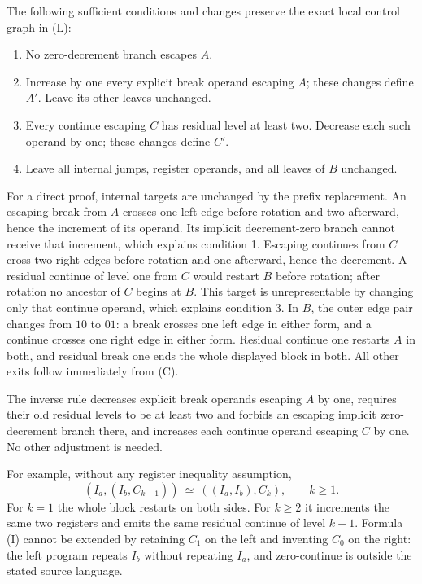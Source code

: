The following sufficient conditions and changes preserve the exact local
control graph in (L):
\begin{enumerate}
\item No zero-decrement branch escapes $A$.
\item Increase by one every explicit break operand escaping $A$; these
changes define $A'$.  Leave its other leaves unchanged.
\item Every continue escaping $C$ has residual level at least two.  Decrease
each such operand by one; these changes define $C'$.
\item Leave all internal jumps, register operands, and all leaves of $B$
unchanged.
\end{enumerate}

For a direct proof, internal targets are unchanged by the prefix replacement.
An escaping break from $A$ crosses one left edge before rotation and two
afterward, hence the increment of its operand.  Its implicit decrement-zero
branch cannot receive that increment, which explains condition 1.  Escaping
continues from $C$ cross two right edges before rotation and one afterward,
hence the decrement.  A residual continue of level one from $C$ would restart
$B$ before rotation; after rotation no ancestor of $C$ begins at $B$.
This target is unrepresentable by changing only that continue operand, which
explains condition 3.  In $B$, the outer edge pair changes from $10$ to $01$:
a break crosses one left edge in either form, and a continue crosses one
right edge in either form.  Residual continue one restarts $A$ in both, and
residual break one ends the whole displayed block in both.  All other exits
follow immediately from (C).

The inverse rule decreases explicit break operands escaping $A$ by one,
requires their old residual levels to be at least two and forbids an escaping
implicit zero-decrement branch there, and increases each continue operand
escaping $C$ by one.  No other adjustment is needed.

For example, without any register inequality assumption,
\[
 (I_a,(I_b,C_{k+1}))\ \simeq\ ((I_a,I_b),C_k),\qquad k\ge1.
\tag{I}
\]
For $k=1$ the whole block restarts on both sides.  For $k\ge2$ it increments
the same two registers and emits the same residual continue of level
$k-1$.  Formula (I) cannot be extended by retaining $C_1$ on the left and
inventing $C_0$ on the right: the left program repeats $I_b$ without repeating
$I_a$, and zero-continue is outside the stated source language.

